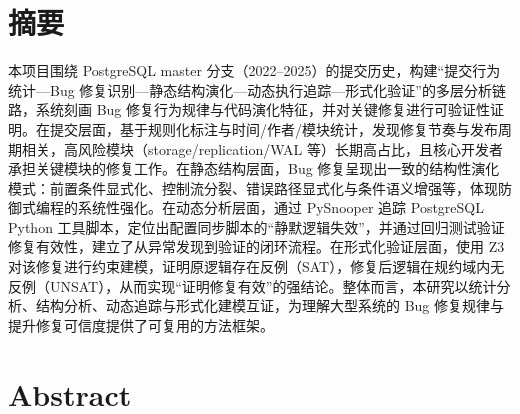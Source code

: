 \maketitle%
\MAKETITLE%
\let\cleardoublepage\clearpage  %
\intobmk\chapter*{摘\quad 要}%
\setcounter{page}{1}%

本项目围绕 PostgreSQL master 分支（2022–2025）的提交历史，构建“提交行为统计—Bug 修复识别—静态结构演化—动态执行追踪—形式化验证”的多层分析链路，系统刻画 Bug 修复行为规律与代码演化特征，并对关键修复进行可验证性证明。在提交层面，基于规则化标注与时间/作者/模块统计，发现修复节奏与发布周期相关，高风险模块（storage/replication/WAL 等）长期高占比，且核心开发者承担关键模块的修复工作。在静态结构层面，Bug 修复呈现出一致的结构性演化模式：前置条件显式化、控制流分裂、错误路径显式化与条件语义增强等，体现防御式编程的系统性强化。在动态分析层面，通过 PySnooper 追踪 PostgreSQL Python 工具脚本，定位出配置同步脚本的“静默逻辑失效”，并通过回归测试验证修复有效性，建立了从异常发现到验证的闭环流程。在形式化验证层面，使用 Z3 对该修复进行约束建模，证明原逻辑存在反例（SAT），修复后逻辑在规约域内无反例（UNSAT），从而实现“证明修复有效”的强结论。整体而言，本研究以统计分析、结构分析、动态追踪与形式化建模互证，为理解大型系统的 Bug 修复规律与提升修复可信度提供了可复用的方法框架。

\intobmk\chapter*{Abstract}%

